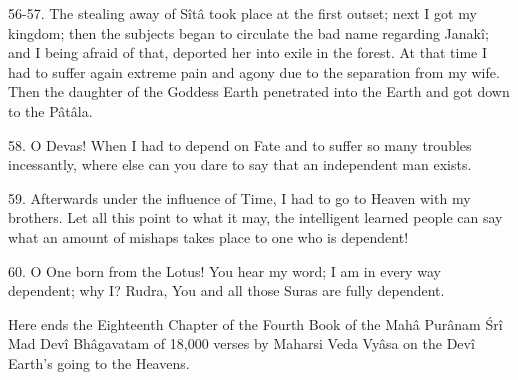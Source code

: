 56-57. The stealing away of S\^it\^a took place at the first outset; next I got my kingdom; then the subjects began to circulate the bad name regarding Janak\^i; and I being afraid of that, deported her into exile in the forest. At that time I had to suffer again extreme pain and agony due to the separation from my wife. Then the daughter of the Goddess Earth penetrated into the Earth and got down to the P\^at\^ala.

58. O Devas! When I had to depend on Fate and to suffer so many troubles incessantly, where else can you dare to say that an independent man exists.

59. Afterwards under the influence of Time, I had to go to Heaven with my brothers. Let all this point to what it may, the intelligent learned people can say what an amount of mishaps takes place to one who is dependent!

60. O One born from the Lotus! You hear my word; I am in every way dependent; why I? Rudra, You and all those Suras are fully dependent.

Here ends the Eighteenth Chapter of the Fourth Book of the Mah\^a Pur\^anam \'Sr\^i Mad Dev\^i Bh\^agavatam of 18,000 verses by Maharsi Veda Vy\^asa on the Dev\^i Earth's going to the Heavens.